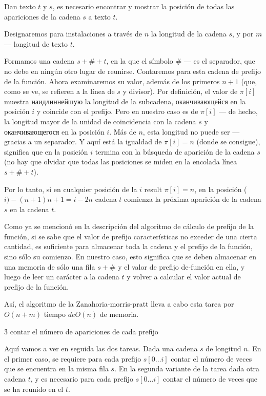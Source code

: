 Dan texto $t$ y $s$, es necesario encontrar y mostrar la posición de todas las apariciones de la cadena $s$ a texto $t$.

Designaremos para instalaciones a través de $n$ la longitud de la cadena $s$, y por $m$ --- longitud de texto $t$.

Formamos una cadena $s + \# + t$, en la que el símbolo $\#$ --- es el separador, que no debe en ningún otro lugar de reunirse. Contaremos para esta cadena de prefijo de la función. Ahora examinaremos su valor, además de los primeros $n+1$ (que, como se ve, se refieren a la línea de $s$ y divisor). Por definición, el valor de $\pi[i]$ muestra наидлиннейшую la longitud de la subcadena, оканчивающейся en la posición $i$ y coincide con el prefijo. Pero en nuestro caso es de $\pi[i]$ --- de hecho, la longitud mayor de la unidad de coincidencia con la cadena $s$ y оканчивающегося en la posición $i$. Más de $n$, esta longitud no puede ser --- gracias a un separador. Y aquí está la igualdad de $\pi[i] = n$ (donde se consigue), significa que en la posición $i$ termina con la búsqueda de aparición de la cadena $s$ (no hay que olvidar que todas las posiciones se miden en la encolada línea $s+\#+t$).

Por lo tanto, si en cualquier posición de la $i$ result $\pi[i] = n$, en la posición ($i) - (n + 1) n + 1 = i - 2 n$ cadena $t$ comienza la próxima aparición de la cadena $s$ en la cadena $t$.

Como ya se mencionó en la descripción del algoritmo de cálculo de prefijo de la función, si se sabe que el valor de prefijo características no exceder de una cierta cantidad, es suficiente para almacenar toda la cadena y el prefijo de la función, sino sólo su comienzo. En nuestro caso, esto significa que se deben almacenar en una memoria de sólo una fila $s + \#$ y el valor de prefijo de-función en ella, y luego de leer un carácter a la cadena $t$ y volver a calcular el valor actual de prefijo de la función.

Así, el algoritmo de la Zanahoria-morris-pratt lleva a cabo esta tarea por $O(n+m)$ tiempo $de O(n)$ de memoria.


\h3{ contar el número de apariciones de cada prefijo }

Aquí vamos a ver en seguida las dos tareas. Dada una cadena $s$ de longitud $n$. En el primer caso, se requiere para cada prefijo $s[0 \ldots i]$ contar el número de veces que se encuentra en la misma fila $s$. En la segunda variante de la tarea dada otra cadena $t$, y es necesario para cada prefijo $s[0 \ldots i]$ contar el número de veces que se ha reunido en el $t$.

